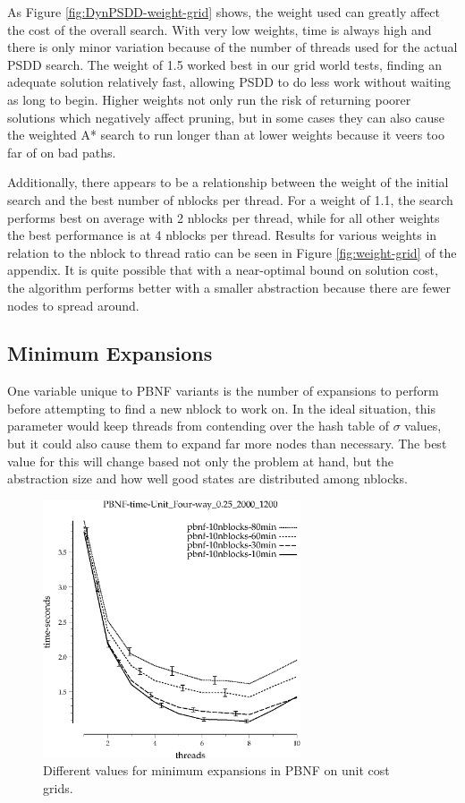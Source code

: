 \documentclass{article}
\begin{document}
As Figure \ref{fig:DynPSDD-weight-grid} shows, the weight used can greatly affect the cost of the overall search. With very low weights, time is always high and there is only minor variation because of the number of threads used for the actual PSDD search. The weight of 1.5 worked best in our grid world tests, finding an adequate solution relatively fast, allowing PSDD to do less work without waiting as long to begin. Higher weights not only run the risk of returning poorer solutions which negatively affect pruning, but in some cases they can also cause the weighted A* search to run longer than at lower weights because it veers too far of on bad paths.

Additionally, there appears to be a relationship between the weight of the initial search and the best number of nblocks per thread. For a weight of 1.1, the search performs best on average with 2 nblocks per thread, while for all other weights the best performance is at 4 nblocks per thread. Results for various weights in relation to the nblock to thread ratio can be seen in Figure \ref{fig:weight-grid} of the appendix. It is quite possible that with a near-optimal bound on solution cost, the algorithm performs better with a smaller abstraction because there are fewer nodes to spread around.
\subsection{Minimum Expansions}
One variable unique to PBNF variants is the number of expansions to perform before attempting to find a new nblock to work on. In the ideal situation, this parameter would keep threads from contending over the hash table of $\sigma$ values, but it could also cause them to expand far more nodes than necessary. The best value for this will change based not only the problem at hand, but the abstraction size and how well good states are distributed among nblocks.

\begin{figure}[h!]
\includegraphics[width=3in]{../graphs/grid_unit_four-way_0.25_2000_1200/PBNF-time-Unit_Four-way_0.25_2000_1200.eps}
\caption{Different values for minimum expansions in PBNF on unit cost grids.}
\label{fig:PBNF-min-grid}
\end{figure}
\end{document}

